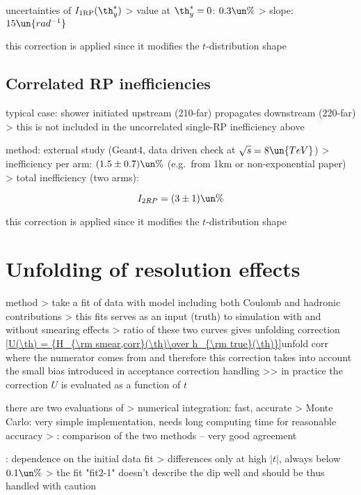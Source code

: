 \> uncertainties of $I_{\rm 1RP}(\th_y^*)$
\>> value at $\th_y^* = 0$: $0.3\un{\%}$
\>> slope: $15\un{rad^{-1}}$

\> this correction is applied since it modifies the $t$-distribution shape


\section[efficiency-correlated]{Correlated RP inefficiencies}

\> typical case: shower initiated upstream (210-far) propagates downstream (220-far)
\>> this is not included in the uncorrelated single-RP inefficiency above

\> method: external study (Geant4, data driven check at $\sqrt s = 8\un{TeV}$)
\>> inefficiency per arm: $(1.5 \pm 0.7)\un{\%}$ (e.g.~from 1km or non-exponential paper)
\>> total inefficiency (two arms):

$$I_{2RP} = (3 \pm 1)\un{\%}$$

\> this correction is applied since it modifies the $t$-distribution shape



\chapter[unfolding]{Unfolding of resolution effects}

\> method
\>> take a fit of data with model including both Coulomb and hadronic contributions
\>> this fits serves as an input (truth) to simulation with and without smearing effects
\>> ratio of these two curves gives unfolding correction
\eqref{U(\th) = {H_{\rm smear,corr}(\th)\over h_{\rm true}(\th)}}{unfold corr}
where the numerator comes from  and therefore this correction takes into account the small bias introduced in acceptance correction handling
\>>> in practice the correction $U$ is evaluated as a function of $t$

\> there are two evaluations of 
\>> numerical integration: fast, accurate
\>> Monte Carlo: very simple implementation, needs long computing time for reasonable accuracy
\>>  : comparison of the two methods -- very good agreement

\>  : dependence on the initial data fit
\>> differences only at high $|t|$, always below $0.1\un{\%}$
\>> the fit "fit2-1" doesn't describe the dip well and should be thus handled with caution

